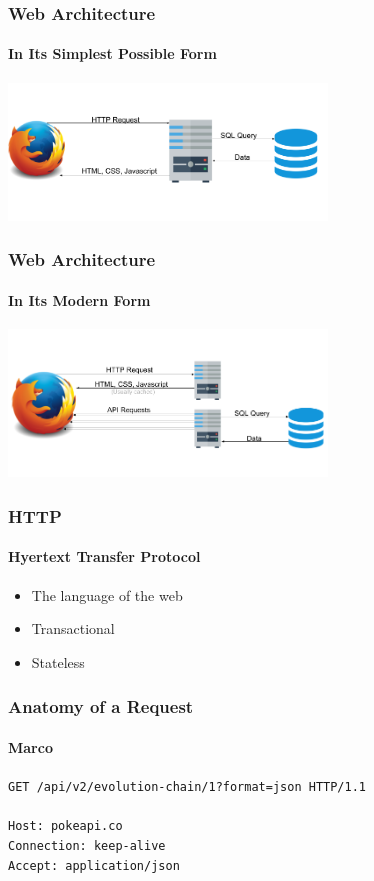 \documentclass{beamer}
\begin{document}
\begin{frame}
  \frametitle{Web Architecture}
  \framesubtitle{In Its Simplest Possible Form}
  \includegraphics[width=320]{img/web-architecture-1.png}
\end{frame}


\begin{frame}
  \frametitle{Web Architecture}
  \framesubtitle{In Its Modern Form}
  \includegraphics[width=320]{img/web-architecture-2.png}
\end{frame}


\begin{frame}
  \frametitle{HTTP}
  \framesubtitle{Hyertext Transfer Protocol}
  \begin{itemize}
    \item The language of the web
    \item Transactional
    \item Stateless
  \end{itemize}
\end{frame}


\begin{frame}
  \frametitle{Anatomy of a Request}
  \framesubtitle{Marco}
  \texttt{{\color{red}GET} {\color{darkgreen}/api/v2/evolution-chain/1}{\color{purple}?format=json} {\color{blue}HTTP/1.1}}
  \pause
  \\
  \bigskip
  \\
  {
    \color{olive}
    \texttt{Host: pokeapi.co} \\
    \texttt{Connection: keep-alive} \\
    \texttt{Accept: application/json}
  }
\end{frame}
\end{document}
